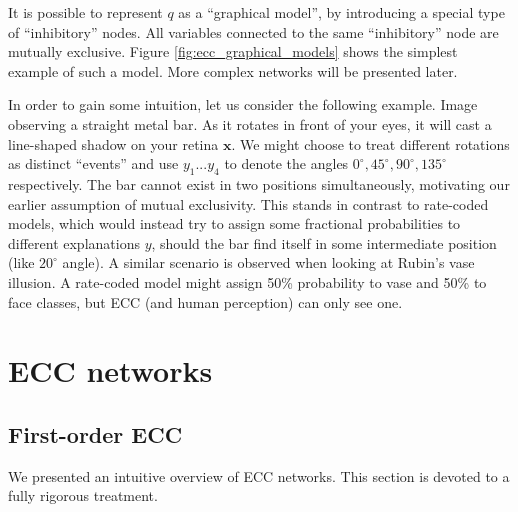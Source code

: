 \documentclass[oneside,english,logo]{amuthesis}
\begin{document}
It is possible to represent $q$ as a ``graphical model'', by introducing a special type of ``inhibitory'' nodes. All variables connected to the same ``inhibitory'' node are mutually exclusive. Figure \ref{fig:ecc_graphical_models} shows the simplest example of such a model. More complex networks will be presented later.

In order to gain some intuition, let us consider the following example. Image observing a straight metal bar. As it rotates in front of your eyes, it will cast a line-shaped shadow on your retina $\boldsymbol{x}$. We might choose to treat different  rotations as distinct ``events'' and use $y_1...y_4$ to denote the angles $0^{\circ},45^{\circ},90^{\circ},135^{\circ}$ respectively. The bar cannot exist in two positions simultaneously, motivating our earlier assumption of mutual exclusivity. This stands in contrast to rate-coded models, which would instead try to assign some fractional probabilities to different explanations $y$, should the bar find itself in some intermediate position (like $20^\circ$ angle). A similar scenario is observed when looking at Rubin's vase illusion. A rate-coded model might assign 50\% probability to vase and 50\% to face classes, but ECC (and human perception) can only see one.

\section{ECC networks}

\subsection{First-order ECC}
We presented an intuitive overview of ECC networks. This section is devoted to a fully rigorous treatment.
\end{document}
